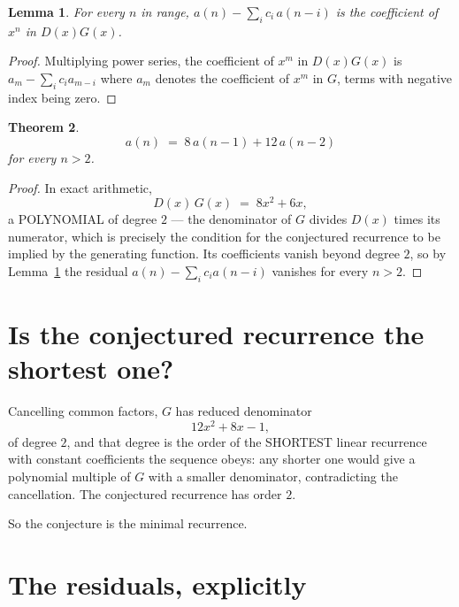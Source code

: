 \documentclass[11pt,a4paper]{article}
\theoremstyle{plain}
\newtheorem{theorem}{Theorem}
\newtheorem{lemma}[theorem]{Lemma}
\theoremstyle{definition}
\begin{document}
\begin{lemma}\label{lem:key}
For every $n$ in range, $a(n)-\sum_i c_i\,a(n-i)$ is the coefficient of $x^{n}$ in
$D(x)G(x)$.
\end{lemma}

\begin{proof}
Multiplying power series, the coefficient of $x^{m}$ in $D(x)G(x)$ is
$a_m-\sum_i c_i a_{m-i}$ where $a_m$ denotes the coefficient of $x^{m}$ in $G$, terms with
negative index being zero.
\end{proof}

\begin{theorem}
\[
a(n)\;=\;8\,a(n-1) + 12\,a(n-2)
\]
for every $n>2$.
\end{theorem}

\begin{proof}
In exact arithmetic,
\[
D(x)\,G(x)\;=\;8 x^{2} + 6 x,
\]
a POLYNOMIAL of degree $2$ --- the denominator of $G$ divides $D(x)$ times its numerator,
which is precisely the condition for the conjectured recurrence to be implied by the
generating function. Its coefficients vanish beyond degree $2$, so by
Lemma~\ref{lem:key} the residual $a(n)-\sum_ic_ia(n-i)$ vanishes for every
$n>2$.
\end{proof}

\section{Is the conjectured recurrence the shortest one?}

Cancelling common factors, $G$ has reduced denominator
\[
12 x^{2} + 8 x - 1,
\]
of degree $2$, and that degree is the order of the SHORTEST linear recurrence with
constant coefficients the sequence obeys: any shorter one would give a polynomial multiple of
$G$ with a smaller denominator, contradicting the cancellation. The conjectured recurrence has
order $2$.

So the conjecture is the minimal recurrence.

\section{The residuals, explicitly}
\end{document}
